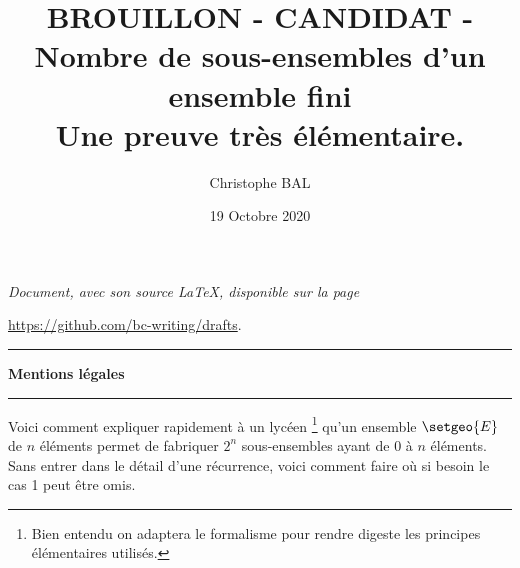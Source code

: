 \documentclass[12pt]{amsart}
\begin{document}
\title{BROUILLON - CANDIDAT - Nombre de sous-ensembles d'un ensemble fini\\Une preuve très élémentaire.}
\author{Christophe BAL}
\date{19 Octobre 2020}


\maketitle

\begin{center}
	\itshape
	Document, avec son source \LaTeX, disponible sur la page
	
	\url{https://github.com/bc-writing/drafts}.
\end{center}


\bigskip


\begin{center}
	\hrule\vspace{.3em}
	{
		\fontsize{1.35em}{1em}\selectfont
		\textbf{Mentions \og légales \fg}
	}
			
	\vspace{0.45em}
	\doclicenseThis
	\hrule
\end{center}


\bigskip



Voici comment expliquer rapidement à un lycéen
\footnote{
	Bien entendu on adaptera le formalisme pour rendre digeste les principes élémentaires utilisés.
}
qu'un ensemble $\setgeo{E}$ de $n$ éléments permet de fabriquer $2^n$ sous-ensembles ayant de $0$ à $n$ éléments. Sans entrer dans le détail d'une récurrence, voici comment faire où si besoin le cas 1 peut être omis.
\end{document}
